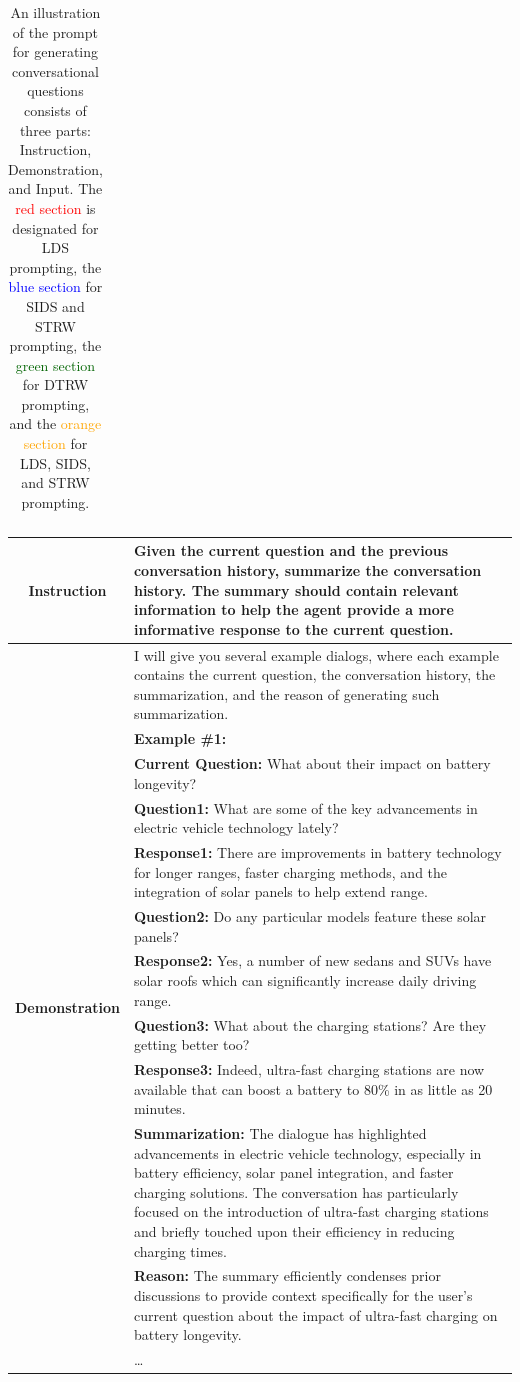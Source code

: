 \documentclass[11pt]{article}
\begin{document}
{\begin{longtable}{c p{12cm}}
\caption{An illustration of the prompt for generating conversational questions consists of three parts: Instruction, Demonstration, and Input. 
The \textcolor{red}{red section} is designated for LDS prompting, the \textcolor{blue}{blue section} for SIDS and STRW prompting, the \textcolor{darkgreen}{green section} for DTRW prompting, and the \textcolor{orange}{orange section} for LDS, SIDS, and STRW prompting.}
\label{prompt_of_generating_conversational_question}
\end{longtable}
\clearpage %
}



\clearpage
\begin{table}[http]
\centering
\begin{tabular}{c p{12cm}}
\toprule
\multirow{3}{*}{\textbf{Instruction}} & Given the current question and the previous conversation history, summarize the conversation history. The summary should contain relevant information to help the agent provide a more informative response to the current question. \\  \midrule


\multirow{28}{*}{\textbf{Demonstration}} & I will give you several example dialogs, where each example contains the current question, the conversation history, the summarization, and the reason of generating such summarization. \\ 
& \textbf{Example \#1:} \\
& \textbf{Current Question:} What about their impact on battery longevity?  \\
& \textbf{Question1:} What are some of the key advancements in electric vehicle technology lately? \\
& \textbf{Response1:} There are improvements in battery technology for longer ranges, faster charging methods, and the integration of solar panels to help extend range. \\
& \textbf{Question2:} Do any particular models feature these solar panels? \\
& \textbf{Response2:} Yes, a number of new sedans and SUVs have solar roofs which can significantly increase daily driving range.\\
& \textbf{Question3:} What about the charging stations? Are they getting better too? \\
& \textbf{Response3:} Indeed, ultra-fast charging stations are now available that can boost a battery to 80\% in as little as 20 minutes.\\
& \textbf{Summarization:} The dialogue has highlighted advancements in electric vehicle technology, especially in battery efficiency, solar panel integration, and faster charging solutions. The conversation has particularly focused on the introduction of ultra-fast charging stations and briefly touched upon their efficiency in reducing charging times.\\
& \textbf{Reason:} The summary efficiently condenses prior discussions to provide context specifically for the user's current question about the impact of ultra-fast charging on battery longevity.\\
& \dots \\



\end{tabular}
\end{table}
\end{document}

